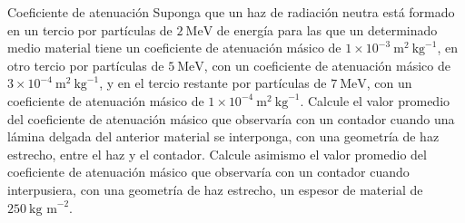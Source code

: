 \begin{Ejercicio}{Coeficiente de atenuación }
Suponga que un haz de radiación neutra está formado en un tercio por partículas de $2\ \text{MeV}$ de energía para las que un determinado medio material tiene un coeficiente de atenuación másico de $1 \times 10^{-3}\ \text{m}^2\ \text{kg}^{-1}$, en otro tercio por partículas de $5\ \text{MeV}$, con un coeficiente de atenuación másico de $3 \times 10^{-4}\ \text{m}^2\ \text{kg}^{-1}$, y en el tercio restante por partículas de $7\ \text{MeV}$, con un coeficiente de atenuación másico de $1 \times 10^{-4}\ \text{m}^2\ \text{kg}^{-1}$. Calcule el valor promedio del coeficiente de atenuación másico que observaría con un contador cuando una lámina delgada del anterior material se interponga, con una geometría de haz estrecho, entre el haz y el contador. Calcule asimismo el valor promedio del coeficiente de atenuación másico que observaría con un contador cuando interpusiera, con una geometría de haz estrecho, un espesor de material de $250\ \text{kg m}^{-2}$.
\end{Ejercicio}
